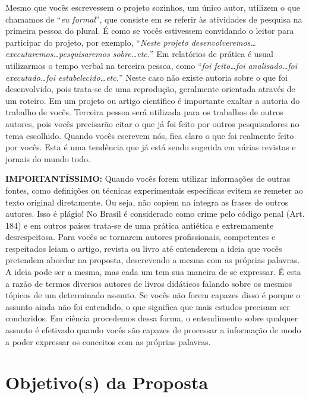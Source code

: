 \documentclass[12pt,oneside,brazil,hidelinks,article,sumario=tradicional,a4paper]{abntex2}
\begin{document}
{\color{red}Mesmo que vocês escrevessem o projeto sozinhos, um único autor, utilizem o que chamamos de ``\emph{eu formal}'', que consiste em se referir às atividades de pesquisa na primeira pessoa do plural.} É como se vocês estivessem convidando o leitor para participar do projeto, por exemplo, ``\emph{Neste projeto desenvolveremos\ldots executaremos\ldots pesquisaremos sobre\ldots etc.}'' Em relatórios de prática é usual utilizarmos o tempo verbal na terceira pessoa, como ``\emph{foi feito\ldots foi analisado\ldots foi executado\ldots foi estabelecido\ldots etc.}'' Neste caso não existe autoria sobre o que foi desenvolvido, pois trata-se de uma reprodução, geralmente orientada através de um roteiro. Em um projeto ou artigo científico é importante exaltar a autoria do trabalho de vocês. Terceira pessoa será utilizada para os trabalhos de outros autores, pois vocês precisarão citar o que já foi feito por outros pesquisadores no tema escolhido. Quando vocês escrevem nós, fica claro o que foi realmente feito por vocês. Esta é uma tendência que já está sendo sugerida em várias revistas e jornais do mundo todo.

\noindent
\textbf{\color{red}IMPORTANTÍSSIMO:} Quando vocês forem utilizar informações de outras fontes, como definições ou técnicas experimentais específicas evitem se remeter ao texto original diretamente. Ou seja, não copiem na íntegra as frases de outros autores. Isso é plágio! No Brasil é considerado como crime pelo código penal (Art. 184) e em outros países trata-se de uma prática antiética e extremamente desrespeitosa. Para vocês se tornarem autores profissionais, competentes e respeitados leiam o artigo, revista ou livro até entenderem a ideia que vocês pretendem abordar na proposta, descrevendo a mesma com as próprias palavras. A ideia pode ser a mesma, mas cada um tem sua maneira de se expressar. É esta a razão de termos diversos autores de livros didáticos falando sobre os mesmos tópicos de um determinado assunto. Se vocês não forem capazes disso é porque o assunto ainda não foi entendido, o que significa que mais estudos precisam ser conduzidos. Em ciência procedemos dessa forma, o entendimento sobre qualquer assunto é efetivado quando vocês são capazes de processar a informação de modo a poder expressar os conceitos com as próprias palavras.

\section{Objetivo(s) da Proposta}\label{sec:objs}
\end{document}
